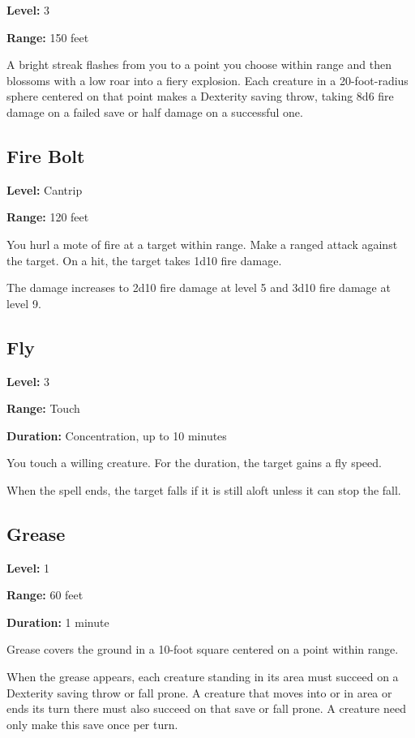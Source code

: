 \documentclass[12pt,letterpaper,twocolumn,openany,nodeprecatedcode,bg=none]{dndbook}
\let\oldsubsection\subsection
\renewcommand{\subsection}[1]{%
  \needspace{5\baselineskip}%
  \oldsubsection{#1}%
}
\begin{document}
\textbf{Level:} 3

\textbf{Range:} 150 feet

A bright streak flashes from you to a point you choose within range and
then blossoms with a low roar into a fiery explosion. Each creature in a
20-foot-radius sphere centered on that point makes a Dexterity saving
throw, taking 8d6 fire damage on a failed save or half damage on a
successful one.

\subsection{Fire Bolt}\label{fire-bolt}

\textbf{Level:} Cantrip

\textbf{Range:} 120 feet

You hurl a mote of fire at a target within range. Make a ranged attack
against the target. On a hit, the target takes 1d10 fire damage.

The damage increases to 2d10 fire damage at level 5 and 3d10 fire damage
at level 9.

\subsection{Fly}\label{fly}

\textbf{Level:} 3

\textbf{Range:} Touch

\textbf{Duration:} Concentration, up to 10 minutes

You touch a willing creature. For the duration, the target gains a fly
speed.

When the spell ends, the target falls if it is still aloft unless it can
stop the fall.

\subsection{Grease}\label{grease}

\textbf{Level:} 1

\textbf{Range:} 60 feet

\textbf{Duration:} 1 minute

Grease covers the ground in a 10-foot square centered on a point within
range.

When the grease appears, each creature standing in its area must succeed
on a Dexterity saving throw or fall prone. A creature that moves into or
in area or ends its turn there must also succeed on that save or fall
prone. A creature need only make this save once per turn.
\end{document}
